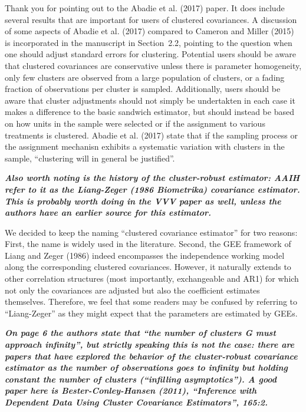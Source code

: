 \documentclass[10pt,a4paper]{article}
\begin{document}
\medskip

Thank you for pointing out to the Abadie et al. (2017) paper. It does include several results that are important for users of clustered covariances. 
A discussion of some aspects of Abadie et al. (2017) compared to Cameron and Miller (2015) is incorporated in the manuscript in Section~2.2, pointing to the question when one should adjust standard errors for clustering.
Potential users should be aware that clustered covariances are conservative unless there is parameter homogeneity, only few clusters are observed from a large population of clusters, or a fading fraction of observations per cluster is sampled.
Additionally, users should be aware that cluster adjustments should not simply be
undertakten in each case it makes a difference to the basic sandwich estimator, but should instead be based on how units in the sample were selected or if the assignment to various treatments is clustered. Abadie et al.
(2017) state that if the sampling process or the assignment mechanisn exhibits a systematic
variation with clusters in the sample, ``clustering will in general be justified''.

\medskip

\textbf{\textit{Also worth noting is the history of the cluster-robust estimator: AAIH refer to it as the Liang-Zeger (1986 Biometrika) covariance estimator.  This is probably worth doing in the VVV paper as well, unless the authors have an earlier source for this estimator.
}}

\medskip

We decided to keep the naming ``clustered covariance estimator'' for two reasons:
First, the name is widely used in the literature.
Second, the GEE framework of Liang and Zeger (1986) indeed encompasses the independence
working model along the corresponding clustered covariances. However, it naturally extends
to other correlation structures (most importantly, exchangeable and AR1) for which not
only the covariances are adjusted but also the coefficient estimates themselves. Therefore,
we feel that some readers may be confused by referring to ``Liang-Zeger'' as they might
expect that the parameters are estimated by GEEs.

\medskip

\textbf{\textit{On page 6 the authors state that ``the number of clusters G must approach infinity'', but strictly speaking this is not the case: there are papers that have explored the behavior of the cluster-robust covariance estimator as the number of observations goes to infinity but holding constant the number of clusters (``infilling asymptotics'').  A good paper here is Bester-Conley-Hansen (2011), ``Inference with Dependent Data Using Cluster Covariance Estimators'', 165:2.
}}
\end{document}
